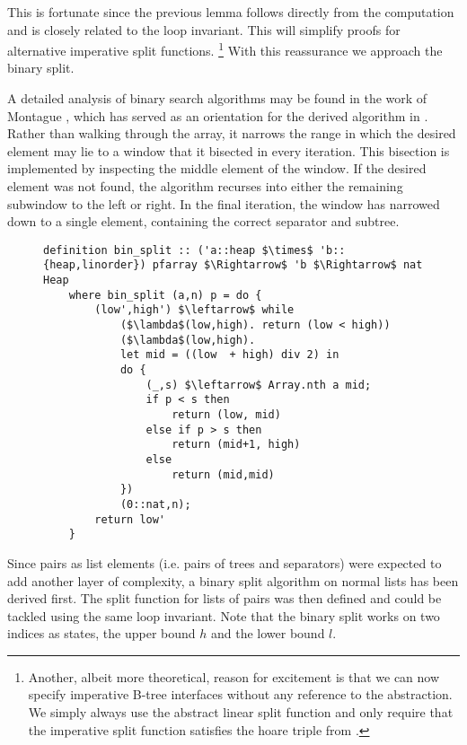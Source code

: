 This is fortunate since the previous lemma
follows directly from the computation and is closely related
to the loop invariant.
This will simplify proofs for alternative imperative split functions.
\footnote{
    Another, albeit more theoretical,
    reason for excitement is that we can now specify imperative B-tree
    interfaces without any reference to the abstraction.
    We simply always use the abstract linear split function
    and only require that the imperative split function satisfies
    the hoare triple from .
}
With this reassurance we approach the binary split.

A detailed analysis of binary search algorithms
may be found in the work of Montague \parencite{DBLP:journals/csedu/Montague91},
which has served as an orientation
for the derived algorithm in .
Rather than walking through the array,
it narrows the range in which the desired element may lie
to a window that it bisected in every iteration.
This bisection is implemented by inspecting the middle element of the window.
If the desired element was not found, the algorithm
recurses into either the remaining subwindow to the left or right.
In the final iteration,
the window has narrowed down to a single element,
containing the correct separator and subtree.

\begin{figure}
\begin{lstlisting}[mathescape=true, language=Isabelle, caption={The imperative binary split},
    label={lst:imp-binary-split}]
definition bin_split :: ('a::heap $\times$ 'b::{heap,linorder}) pfarray $\Rightarrow$ 'b $\Rightarrow$ nat Heap 
    where bin_split (a,n) p = do { 
        (low',high') $\leftarrow$ while  
            ($\lambda$(low,high). return (low < high))  
            ($\lambda$(low,high).
            let mid = ((low  + high) div 2) in 
            do { 
                (_,s) $\leftarrow$ Array.nth a mid; 
                if p < s then 
                    return (low, mid) 
                else if p > s then 
                    return (mid+1, high) 
                else
                    return (mid,mid) 
            })  
            (0::nat,n); 
        return low' 
    }
\end{lstlisting}
\end{figure}

Since pairs as list elements (i.e. pairs of trees and separators)
were expected to add another layer of complexity,
a binary split algorithm on normal lists has been derived first.
The split function for lists of pairs was then defined
and could be tackled using the same loop invariant.
Note that the binary split works on two indices
as states, the upper bound $h$ and the lower bound $l$.

